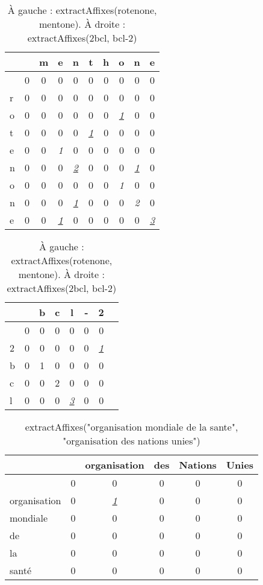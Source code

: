 \documentclass[PhD-Yoann-Dupont.tex]{subfiles}
\begin{document}
\begin{table}[ht!]
\begin{minipage}{0.49\linewidth}
\centering
\begin{tabular}{l|ccccccccc}
  &    & m & e & n & t & h & o & n & e \\
\hline
  &  0 & 0 & 0 & 0 & 0 & 0 & 0 & 0 & 0 \\
r &  0 & 0 & 0 & 0 & 0 & 0 & 0 & 0 & 0 \\
o &  0 & 0 & 0 & 0 & 0 & 0 & \underline{\textit{1}} & 0 & 0 \\
t &  0 & 0 & 0 & 0 & \underline{\textit{1}} & 0 & 0 & 0 & 0 \\
e &  0 & 0 & \textit{1} & 0 & 0 & 0 & 0 & 0 & 0 \\
n &  0 & 0 & 0 & \underline{\textit{2}} & 0 & 0 & 0 & \underline{\textit{1}} & 0 \\
o &  0 & 0 & 0 & 0 & 0 & 0 & \textit{1} & 0 & 0 \\
n &  0 & 0 & 0 & \underline{\textit{1}} & 0 & 0 & 0 & \textit{2} & 0 \\
e &  0 & 0 & \underline{\textit{1}} & 0 & 0 & 0 & 0 & 0 & \underline{\textit{3}} \\
\end{tabular}
\end{minipage}
\begin{minipage}{0.49\linewidth}
\centering
\begin{tabular}{l|ccccccc}
  &    & b & c & l & - & 2 \\
\hline
  &  0 & 0 & 0 & 0 & 0 & 0 \\
2 &  0 & 0 & 0 & 0 & 0 & \underline{\textit{1}} \\
b &  0 & 1 & 0 & 0 & 0 & 0 \\
c &  0 & 0 & 2 & 0 & 0 & 0 \\
l &  0 & 0 & 0 & \underline{\textit{3}} & 0 & 0 \\
\end{tabular}
\end{minipage}
\caption{À gauche : extractAffixes(rotenone, mentone). À droite : extractAffixes(2bcl, bcl-2)}
\label{tab:extractAffixes}
\end{table}

\begin{table}[ht!]
\centering
\begin{tabular}{l|ccccc}
             &    & organisation & des & Nations & Unies\\
\hline
             &  0 & 0 & 0 & 0 & 0 \\
organisation &  0 & \underline{\textit{1}} & 0 & 0 & 0 \\
mondiale     &  0 & 0 & 0 & 0 & 0 \\
de           &  0 & 0 & 0 & 0 & 0 \\
la           &  0 & 0 & 0 & 0 & 0 \\
santé        &  0 & 0 & 0 & 0 & 0 \\
\end{tabular}
\caption{extractAffixes("organisation mondiale de la sante", "organisation des nations unies")}
\label{tab:keyword-extraction}
\end{table}
\end{document}
